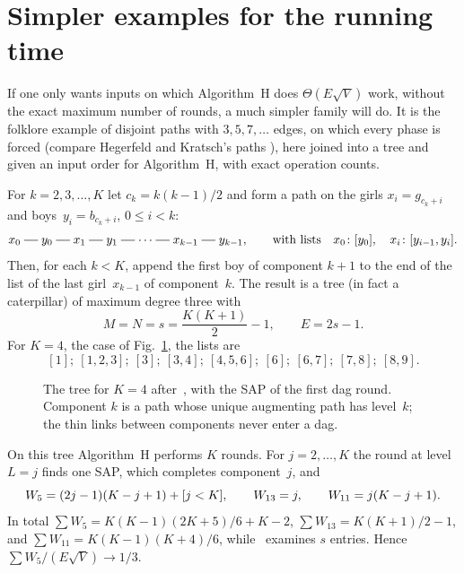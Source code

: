 \section{Simpler examples for the running time}
\label{sec:sparse}

If one only wants inputs on which Algorithm~H does $\Theta(E\sqrt V)$ work,
without the exact maximum number of rounds, a much simpler family will do.
It is the folklore example of disjoint paths with $3,5,7,\ldots$ edges, on
which every phase is forced (compare Hegerfeld and Kratsch's paths
\cite[Section~5.1]{HegerfeldKratsch}), here joined into a tree and given an
input order for Algorithm~H, with exact operation counts.

For $k=2,3,\ldots,K$ let $c_k=k(k-1)/2$ and form a path on the girls
$x_i=g_{c_k+i}$ and boys~$y_i=b_{c_k+i}$, $0\le i<k$:
\[
   x_0\sg y_0\sg x_1\sg y_1\sg\cdots\sg x_{k-1}\sg y_{k-1},
   \qquad\text{with lists}\quad x_0\colon[y_0],\quad x_i\colon[y_{i-1},y_i].
\]
Then, for each $k<K$, append the first boy of component $k+1$ to the end of
the list of the last girl~$x_{k-1}$ of component~$k$. The result is a tree
(in fact a caterpillar) of maximum degree three with
\[
   M=N=s=\frac{K(K+1)}2-1,\qquad E=2s-1 .
\]
For $K=4$, the case of Fig.~\ref{fig:caterpillar}, the lists are
\[
  [1];\ [1,2,3];\ [3];\ [3,4];\ [4,5,6];\ [6];\ [6,7];\ [7,8];\ [8,9].
\]

\begin{figure}[ht]
\centering

\caption{The tree for $K=4$ after~, with the SAP of the first dag round.
Component $k$ is a path whose unique augmenting path has level~$k$; the
thin links between components never enter a dag.}
\label{fig:caterpillar}
\end{figure}

\begin{proposition}
On this tree Algorithm~H performs $K$ rounds. For $j=2,\ldots,K$ the
round at level~$L=j$ finds one SAP, which completes component~$j$, and
\[
   W_5=(2j-1)(K-j+1)+[j<K],\qquad W_{13}=j,\qquad W_{11}=j(K-j+1).
\]
In total $\sum W_5=K(K-1)(2K+5)/6+K-2$, $\sum W_{13}=K(K+1)/2-1$, and
$\sum W_{11}=K(K-1)(K+4)/6$, while~ examines $s$ entries. Hence
$\sum W_5/(E\sqrt V)\to1/3$.
\end{proposition}

